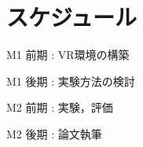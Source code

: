 \section{スケジュール}
  \begin{description}
    \item M1 前期 :  VR環境の構築
    \item M1 後期 :  実験方法の検討
    \item M2 前期 :  実験，評価
    \item M2 後期 :  論文執筆 
  \end{description}
